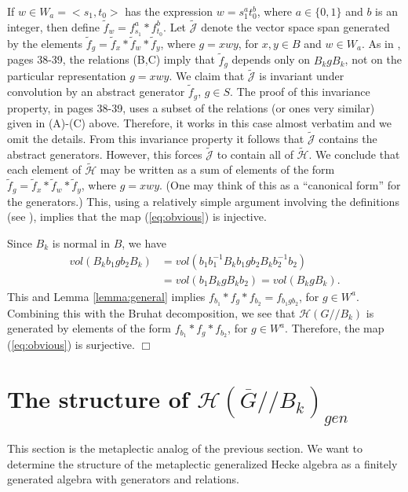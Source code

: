 \documentclass[12pt,letterpaper]{amsart}
\theoremstyle{definition}
\theoremstyle{remark}
\begin{document}
If $w\in W_a=<s_1,t_0>$ has the expression
$w=s_1^a t_0^b$, where $a\in \{0,1\}$ and $b$ is an integer,
then define $\tilde{f}_w=f_{s_1}^a*f_{t_0}^b$.
Let $\tilde{\mathcal{J}}$ denote the 
vector space span generated by the elements 
$\tilde{f}_g=\tilde{f}_x*\tilde{f}_w*\tilde{f}_y$, where
$g=xwy$, for $x,y\in B$ and $w \in W_a$. 
As in \cite{H}, pages 38-39, the relations (B,C) 
imply that $\tilde{f}_g$ depends only on $B_kgB_k$,
not on the particular representation $g=xwy$.
We claim that 
$\tilde{\mathcal{J}}$ is invariant under convolution by 
an abstract generator $\tilde{f}_g$, $g\in S$.
The proof of this invariance property, in \cite{H} pages 38-39,
uses a subset of the relations (or ones very similar) given in
(A)-(C) above. Therefore, it works in this case almost
verbatim and we omit the details. 
From this invariance property it follows that $\tilde{\mathcal{J}}$
contains the abstract generators. However, this
forces $\tilde{\mathcal{J}}$ to contain all of 
$\tilde{\mathcal{H}}$. We
conclude that each element of $\tilde{\mathcal{H}}$
may be written as a sum of elements of the form 
$\tilde{f}_g=\tilde{f}_x*\tilde{f}_w*\tilde{f}_y$, where
$g=xwy$. (One may think of this as a
``canonical form'' for the generators.)
This, using a relatively simple argument involving the
definitions (see \cite{H}), implies that the map (\ref{eq:obvious}) is 
injective.  

Since $B_k$ is normal in $B$, we have
\[
\begin{aligned}
vol(B_k b_1g b_2 B_k)
&=vol(b_1 b_1^{-1}B_k b_1 g b_2 B_k b_2^{-1} b_2)\\
&=vol(b_1 B_k g B_kb_2)=vol(B_k g B_k).
\end{aligned}
\]
This and Lemma \ref{lemma:general} implies 
$f_{b_1}*f_g*f_{b_2}=f_{b_1gb_2}$, for $g\in W^a$. 
Combining this with the Bruhat decomposition, we see
that $\mathcal{H}(G//B_k)$ is generated by elements of the form
$f_{b_1}*f_g*f_{b_2}$, for $g\in W^a$. 
Therefore, the map (\ref{eq:obvious}) is surjective.      $\Box$ 


\section{The structure of $\mathcal{H}(\overline{G}//B_k)_{gen}$}
\label{section:metaplectic}

This section is the metaplectic analog of the previous section.
We want to determine the structure of the metaplectic
generalized Hecke algebra as
a finitely generated algebra with generators and relations. 
\end{document}
